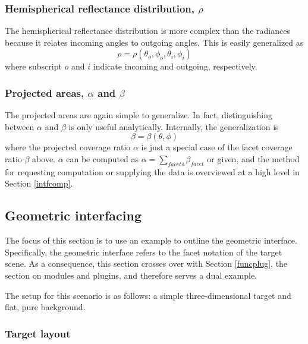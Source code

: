 \documentclass{article}
\numberwithin{equation}{section}
\begin{document}
        \subsubsection*{Hemispherical reflectance distribution, $\rho$}

            The hemispherical reflectance distribution is more complex than the radiances because it relates
            incoming angles to outgoing angles.
            This is easily generalized as
            $$\rho = \rho(\theta_o,\phi_o,\theta_i,\phi_i)$$
            where subscript $o$ and $i$ indicate incoming and outgoing, respectively.

        \subsubsection*{Projected areas, $\alpha$ and $\beta$}

            The projected areas are again simple to generalize.
            In fact, distinguishing between $\alpha$ and $\beta$ is only useful analytically.
            Internally, the generalization is
            $$\beta=\beta(\theta,\phi)$$
            where the projected coverage ratio $\alpha$ is just a special case of the facet coverage ratio $\beta$
            above.
            $\alpha$ can be computed as $\alpha = \sum_{facets}\beta_{facet}$ or given, and the method for
            requesting computation or supplying the data is overviewed at a high level in Section
            \ref{intfcomp}.

    \subsection{Geometric interfacing} \label{intfgeo}
        
        The focus of this section is to use an example to outline the geometric interface.
        Specifically, the geometric interface refers to the facet notation of the target scene.
        As a consequence, this section crosses over with Section \ref{funcplug}, the section on modules and
        plugins, and therefore serves a dual example.

        The setup for this scenario is as follows: a simple three-dimensional target and flat, pure background.

        \subsubsection*{Target layout}
\end{document}

